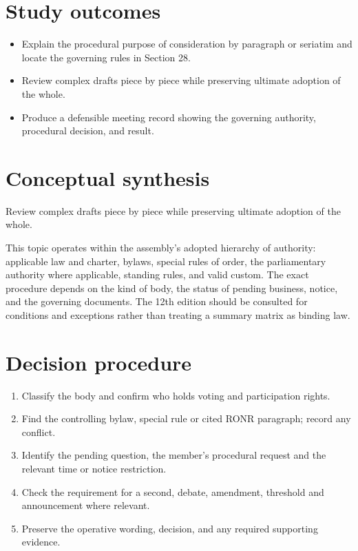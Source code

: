 \documentclass[11pt]{article}
\begin{document}
\SuiteOpen
{}
\section{Study outcomes}
\begin{itemize}[leftmargin=*,itemsep=4pt]
\item Explain the procedural purpose of consideration by paragraph or seriatim and locate the governing rules in Section 28.
\item Review complex drafts piece by piece while preserving ultimate adoption of the whole.
\item Produce a defensible meeting record showing the governing authority, procedural decision, and result.
\end{itemize}

\section{Conceptual synthesis}
Review complex drafts piece by piece while preserving ultimate adoption of the whole.

This topic operates within the assembly’s adopted hierarchy of authority: applicable law and charter, bylaws, special rules of order, the parliamentary authority where applicable, standing rules, and valid custom. The exact procedure depends on the kind of body, the status of pending business, notice, and the governing documents. The 12th edition should be consulted for conditions and exceptions rather than treating a summary matrix as binding law.
\section{Decision procedure}
\begin{enumerate}[leftmargin=*,itemsep=4pt]
\item Classify the body and confirm who holds voting and participation rights.
\item Find the controlling bylaw, special rule or cited RONR paragraph; record any conflict.
\item Identify the pending question, the member’s procedural request and the relevant time or notice restriction.
\item Check the requirement for a second, debate, amendment, threshold and announcement where relevant.
\item Preserve the operative wording, decision, and any required supporting evidence.
\end{enumerate}
\end{document}
